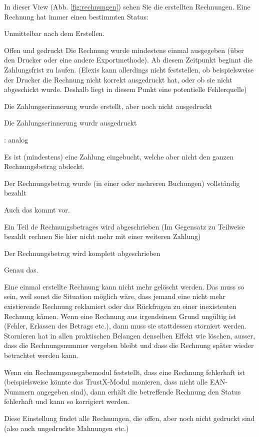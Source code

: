 In dieser View (Abb. \ref{fig:rechnungen}) sehen Sie die erstellten Rechnungen. Eine Rechnung hat immer einen bestimmten Status:
\begin{description}
    \item [Offen] Unmittelbar nach dem Erstellen.
    \item{Offen und gedruckt} Die Rechnung wurde mindestens einmal ausgegeben (über den Drucker oder eine andere Exportmethode). Ab diesem Zeitpunkt beginnt die Zahlungsfrist zu laufen. (Elexis kann allerdings nicht feststellen, ob beispielsweise der Drucker die Rechnung nicht korrekt ausgedruckt hat, oder ob sie nicht abgeschickt wurde. Deshalb liegt in diesem Punkt eine potentielle Fehlerquelle)
    \item[Zahlungserinnerung] Die Zahlungserinnerung wurde erstellt, aber noch nicht ausgedruckt
    \item[ZE gedruckt] Die Zahlungserinnerung wurdr ausgedruckt
    \item [2. Mahnung erstellt, 2. Mahnung gedruckt, 3. Mahnung erstellt, 3. Mahnung gedruckt]: analog
    \item[Teilweise bezahlt] Es ist (mindestens) eine Zahlung eingebucht, welche aber nicht den ganzen Rechnungsbetrag abdeckt.
    \item[bezahlt] Der Rechnungsbetrag wurde (in einer oder mehreren Buchungen) vollständig bezahlt
    \item [zuviel bezahlt] Auch das kommt vor.
    \item [Teilverlust] Ein Teil de Rechnungsbetrages wird abgeschrieben (Im Gegensatz zu \glqq Teilweise bezahlt\grqq{} rechnen Sie hier nicht mehr mit einer weiteren Zahlung)
    \item [Totalverlust] Der Rechnungsbetrag wird komplett abgeschrieben
    \item [In Betreibung] Genau das.
    \item [Storniert] Eine einmal erstellte Rechnung kann nicht mehr gelöscht werden. Das muss so sein, weil sonst die Situation möglich wäre, dass jemand eine nicht mehr existierende Rechnung reklamiert oder das Rückfragen zu einer inexistenten Rechnung kämen. Wenn eine Rechnung aus irgendeinem Grund ungültig ist (Fehler, Erlassen des Betrags etc.), dann muss sie stattdessen storniert werden. Stornieren hat in allen praktischen Belangen denselben Effekt wie löschen, ausser, dass die Rechnungsnummer vergeben bleibt und dass die Rechnung später wieder betrachtet werden kann.
    \item [fehlerhaft] Wenn ein Rechnungsausgabemodul feststellt, dass eine Rechnung fehlerhaft ist (beispielsweise könnte das TrustX-Modul monieren, dass nicht alle EAN-Nummern angegeben sind), dann erhält die betreffende Rechnung den Status fehlerhaft und kann so korrigiert werden.
    \item [zu drucken] Diese Einstellung findet alle Rechnungen, die offen, aber noch nicht gedruckt sind (also auch ungedruckte Mahnungen etc.)
\end{description}
